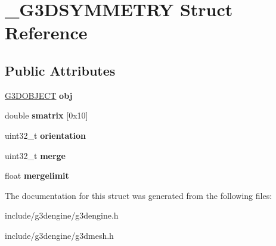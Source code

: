 \hypertarget{struct__G3DSYMMETRY}{}\section{\+\_\+\+G3\+D\+S\+Y\+M\+M\+E\+T\+RY Struct Reference}
\label{struct__G3DSYMMETRY}
\subsection*{Public Attributes}
\begin{DoxyCompactItemize}
\item 
\mbox{\label{struct__G3DSYMMETRY_a35298b7dd1c595e94dc9439f6fcede6d}} 
\hyperlink{struct__G3DOBJECT}{G3\+D\+O\+B\+J\+E\+CT} {\bfseries obj}
\item 
\mbox{\label{struct__G3DSYMMETRY_ad62d601029500d7ad0bb5ddcb34f19df}} 
double {\bfseries smatrix} \mbox{[}0x10\mbox{]}
\item 
\mbox{\label{struct__G3DSYMMETRY_af6744ee8216af451b7a5232f775a902f}} 
uint32\+\_\+t {\bfseries orientation}
\item 
\mbox{\label{struct__G3DSYMMETRY_a1fe97a3b89838cde29e60a110ee463fb}} 
uint32\+\_\+t {\bfseries merge}
\item 
\mbox{\label{struct__G3DSYMMETRY_a5b8112bc18ac4229383324578addbe97}} 
float {\bfseries mergelimit}
\end{DoxyCompactItemize}


The documentation for this struct was generated from the following files\+:\begin{DoxyCompactItemize}
\item 
include/g3dengine/g3dengine.\+h\item 
include/g3dengine/g3dmesh.\+h\end{DoxyCompactItemize}
